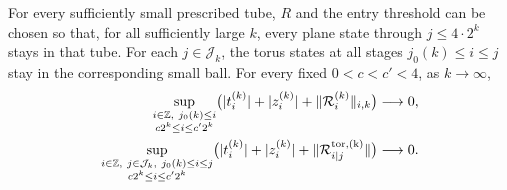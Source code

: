 \begin{lemma}\label{trj:vanishing}
For every sufficiently small prescribed tube, \(R\) and the entry
threshold can be chosen so that, for all sufficiently large \(k\),
every plane state through \(j\le4\cdot2^k\) stays in that tube.
For each \(j\in\mathcal J_k\), the torus states at all stages
\(j_0(k)\le i\le j\) stay in the corresponding small ball.
For every fixed \(0<c<c'<4\), as \(k\to\infty\),
\begin{equation}\label{trj:vanishing-ranges}
 \begin{split}
 \sup_{\substack{i\in\mathbb Z,\ j_0(k)\le i\\c2^k\le i\le c'2^k}}
 \bigl(|t_i^{(k)}|+|z_i^{(k)}|
                   +\|\mathcal R_i^{(k)}\|_{i,k}\bigr)&\longrightarrow0,\\
 \sup_{\substack{i\in\mathbb Z,\ j\in\mathcal J_k,\ j_0(k)\le i\le j\\
                  c2^k\le i\le c'2^k}}
 \bigl(|t_i^{(k)}|+|z_i^{(k)}|
                   +\|\mathcal R_{i|j}^{\rm tor,(k)}\|\bigr)&\longrightarrow0.
 \end{split}
\end{equation}
\end{lemma}


